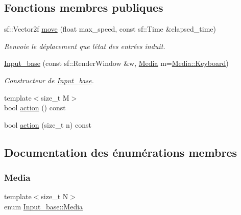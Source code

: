\subsection*{Fonctions membres publiques}
\begin{DoxyCompactItemize}
\item 
sf\+::\+Vector2f \hyperlink{class_input__base_a61bba67b702dfd77db2091409ab1d20b}{move} (float max\+\_\+speed, const sf\+::\+Time \&elapsed\+\_\+time)
\begin{DoxyCompactList}\small\item\em Renvoie le déplacement que l\textquotesingle{}état des entrées induit. \end{DoxyCompactList}\item 
\hyperlink{class_input__base_a4e1efd96da3e870a9b2f6613b99e6c00}{Input\+\_\+base} (const sf\+::\+Render\+Window \&w, \hyperlink{class_input__base_a455585e7933485981b3d7bfcad3a47c6}{Media} m=\hyperlink{class_input__base_a455585e7933485981b3d7bfcad3a47c6a6ce4d85a628a88bbdb3ac24a8e5a9c2e}{Media\+::\+Keyboard})
\begin{DoxyCompactList}\small\item\em Constructeur de \hyperlink{class_input__base}{Input\+\_\+base}. \end{DoxyCompactList}\item 
{\footnotesize template$<$size\+\_\+t M$>$ }\\bool \hyperlink{class_input__base_a48b1df2773bd0bea3c547332f2337af6}{action} () const
\item 
bool \hyperlink{class_input__base_ab525fda1b2cc71094d8c0940c80cba27}{action} (size\+\_\+t n) const
\end{DoxyCompactItemize}


\subsection{Documentation des énumérations membres}
\mbox{\label{class_input__base_a455585e7933485981b3d7bfcad3a47c6}} 
\subsubsection{\texorpdfstring{Media}{Media}}
{\footnotesize\ttfamily template$<$size\+\_\+t N$>$ \\
enum \hyperlink{class_input__base_a455585e7933485981b3d7bfcad3a47c6}{Input\+\_\+base\+::\+Media}\hspace{0.3cm}{\ttfamily [strong]}}



